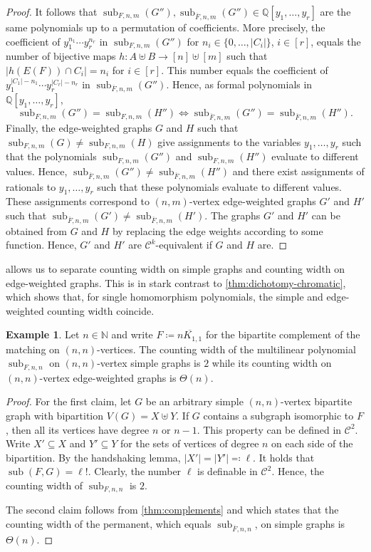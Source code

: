 \documentclass[11pt, DIV=15]{scrarticle}
\theoremstyle{definition}
\newtheorem{example}[definition]{Example}
\theoremstyle{plain}
\theoremstyle{remark}
\DeclareMathOperator{\sub}{sub}
\begin{document}
\begin{proof}
		It follows that $\sub_{F, n,m}(G''), \sub_{\overline{F}, n,m}(G'') \in \mathbb{Q}[y_1, \dots, y_r]$ are the same polynomials up to a permutation of coefficients.
		More precisely,
		the coefficient of $y_1^{n_1} \cdots y_r^{n_r}$ in $\sub_{F, n,m}(G'')$ for $n_i \in \{0, \dots, |C_i|\}$, $i \in [r]$, 
		equals the number of bijective maps $h \colon A \uplus B \to [n] \uplus [m]$ such that $|h(E(F)) \cap C_i| = n_i$ for $i \in [r]$.
		This number equals the coefficient of $y_1^{|C_1| - n_1} \cdots y_r^{|C_r| - n_r}$ in $ \sub_{\overline{F}, n,m}(G'')$.
		Hence, as formal polynomials in $\mathbb{Q}[y_1, \dots, y_r]$, 
		\[
			 \sub_{F, n,m}(G'') =  \sub_{F, n,m}(H'') \iff  \sub_{\overline{F}, n,m}(G'') =  \sub_{\overline{F}, n,m}(H'').
		\]
		Finally, the edge-weighted graphs $G$ and $H$ such that $\sub_{F, n,m}(G) \neq \sub_{F, n,m}(H)$
		give assignments to the variables $y_1, \dots, y_r$ such that the polynomials $ \sub_{F, n,m}(G'')$ and $\sub_{F, n,m}(H'')$ evaluate to different values.
		Hence,  $ \sub_{\overline{F}, n,m}(G'') \neq  \sub_{\overline{F}, n,m}(H'')$
		and there exist assignments of rationals to $y_1, \dots, y_r$ such that these polynomials evaluate to different values.
		These assignments correspond to $(n,m)$-vertex edge-weighted graphs $G'$ and $H'$ such that $\sub_{\overline{F}, n,m}(G') \neq \sub_{\overline{F}, n,m}(H')$.
		The graphs $G'$ and $H'$ can be obtained from $G$ and $H$ by replacing the edge weights according to some function.
		Hence, $G'$ and $H'$ are $\mathcal{C}^k$-equivalent if $G$ and $H$ are.
	\end{proof}
	 allows us to separate counting width on simple graphs and counting width on edge-weighted graphs.
	This is in stark contrast to \cref{thm:dichotomy-chromatic}, which shows that, for single homomorphism polynomials, the simple and edge-weighted counting width coincide.
	\begin{example}\label{ex:matching}
		Let $n \in \mathbb{N}$
		and write $F \coloneqq \overline{nK_{1,1}}$ for the bipartite complement of the matching on $(n,n)$-vertices.
		The counting width of the multilinear polynomial $\sub_{F, n,n}$ on $(n,n)$-vertex simple graphs is $2$ while its counting width on $(n,n)$-vertex edge-weighted graphs is $\Theta(n)$.
	\end{example}
	\begin{proof}
		For the first claim, let $G$ be an arbitrary simple $(n,n)$-vertex bipartite graph with bipartition $V(G) = X \uplus Y$.
		If $G$ contains a subgraph isomorphic to $F$,
		then all its vertices have degree $n$ or $n-1$.
		This property can be defined in $\mathcal{C}^2$.
		Write $X' \subseteq X$ and $Y' \subseteq Y$ for the sets of vertices of degree $n$ on each side of the bipartition.
		By the handshaking lemma,  $|X'| = |Y'| \eqqcolon \ell$.
		It holds that $\sub(F,G) = \ell!$.
		Clearly, the number $\ell$ is definable in $\mathcal{C}^2$.
		Hence, the counting width of $\sub_{F,n,n}$ is $2$.

		The second claim follows from \cref{thm:complements} and \cite[Theorem~7.2]{dawar_symmetric_2025} which states that the counting width of the permanent, which equals $\sub_{\overline{F}, n,n}$, on simple graphs is $\Theta(n)$.
	\end{proof}
\end{document}
